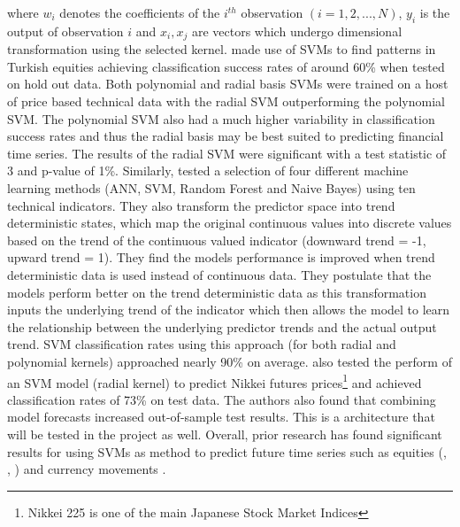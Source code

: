 \documentclass[12pt, a4paper]{article}
\begin{document}
where $w_{i}$ denotes the coefficients of the $i^{th}$ observation $(i = 1,2,...,N)$, $y_{i}$ is the output of observation $i$ and $x_{i}, x_{j}$ are vectors which undergo dimensional transformation using the selected kernel.
 \cite{Kara2011} made use of SVMs to find patterns in Turkish equities achieving classification success rates of around 60\% when tested on hold out data. Both polynomial and radial basis SVMs were trained on a host of price based technical data with the radial SVM outperforming the polynomial SVM. The polynomial SVM also had a much higher variability in classification success rates and thus the radial basis may be best suited to predicting financial time series. The results of the radial SVM were significant with a test statistic of 3 and p-value of 1\%. 
\newline Similarly, \cite{Patel2015} tested a selection of four different machine learning methods (ANN, SVM, Random Forest and Naive Bayes) using ten technical indicators. They also transform the predictor space into trend deterministic states, which map the original continuous values into discrete values based on the trend of the continuous valued indicator (downward trend = -1, upward trend = 1). They find the models performance is improved when trend deterministic data is used instead of continuous data. They postulate that the models perform better on the trend deterministic data as this transformation inputs the underlying trend of the indicator which then allows the model to learn the relationship between the underlying predictor trends and the actual output trend. SVM classification rates using this approach (for both radial and polynomial kernels) approached nearly 90\% on average.
\cite{Huang2005} also tested the perform of an SVM model (radial kernel) to predict Nikkei futures prices\footnote{Nikkei 225 is one of the main Japanese Stock Market Indices} and achieved classification rates of 73\% on test data. The authors also found that combining model forecasts increased out-of-sample test results. This is a architecture that will be tested in the project as well.
Overall, prior research has found significant results for using SVMs as method to predict future time series such as equities (\cite{Gui2015}, \cite{Shen2012}, \cite{Kim2003}) and currency movements \cite{Kamruzzaman2004}.
\end{document}
